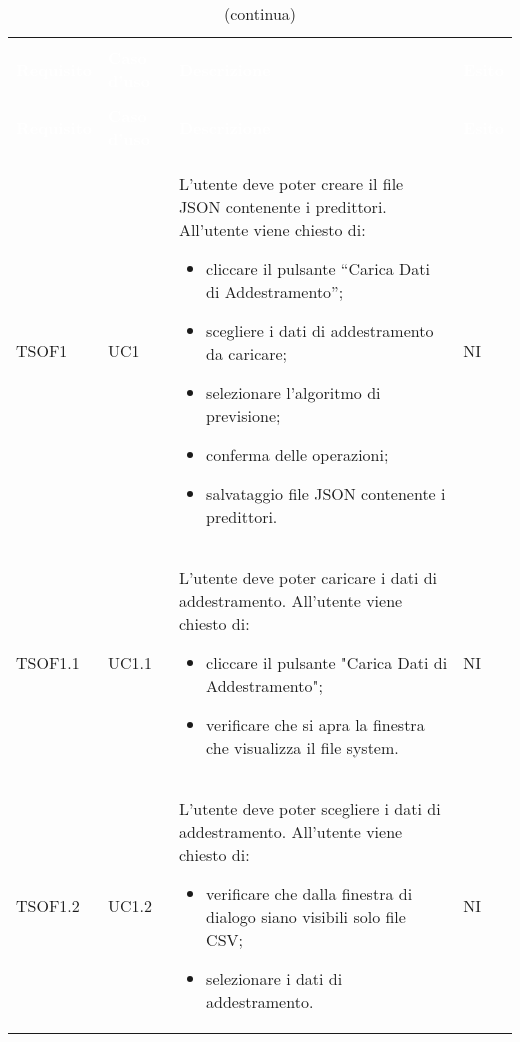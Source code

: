 \begin{longtable}{C{2.5cm} C{2.5cm} L{8cm} C{2cm}}
\caption{Tabella dei test} \\
\textcolor{white}{\textbf{Requisito}} &
\textcolor{white}{\textbf{Caso d'uso}} &
\textcolor{white}{\textbf{Descrizione}} &
\textcolor{white}{\textbf{Esito}} \\
		\endfirsthead
		\caption[]{(continua)} \\
\textcolor{white}{\textbf{Requisito}} &
\textcolor{white}{\textbf{Caso d'uso}} &
\textcolor{white}{\textbf{Descrizione}} &
\textcolor{white}{\textbf{Esito}} \\
		\endhead
TSOF1 & UC1 &
L'utente deve poter creare il file JSON contenente i predittori. \newline
All'utente viene chiesto di:
\begin{itemize}
	\item cliccare il pulsante “Carica Dati di Addestramento”;
	\item scegliere i dati di addestramento da caricare;
	\item selezionare l’algoritmo di previsione;
	\item conferma delle operazioni;
	\item salvataggio file JSON contenente i predittori.
\end{itemize} & NI \\

TSOF1.1 & UC1.1 &
L'utente deve poter caricare i dati di addestramento. \newline All'utente viene chiesto di:
\begin{itemize}
 	\item cliccare il pulsante "Carica Dati di Addestramento";
 	\item verificare che si apra la finestra che visualizza il file system.
\end{itemize} & NI	\\


TSOF1.2 & UC1.2 &
L'utente deve poter scegliere i dati di addestramento. \newline All'utente viene chiesto di:
\begin{itemize}
 	\item verificare che dalla finestra di dialogo siano visibili solo file CSV;
	\item selezionare i dati di addestramento.
\end{itemize} 
& NI \\
 

\end{longtable}

